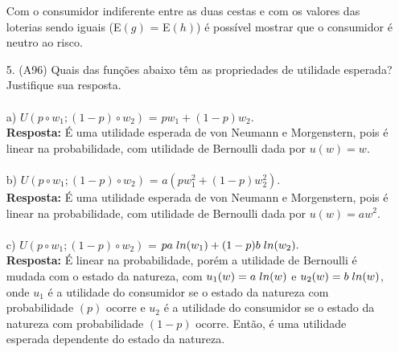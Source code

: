 \begin{enumerate}
Com o consumidor indiferente entre as duas cestas e com os valores das loterias sendo iguais (E{$(g)$} = E{$(h)$}) é possível mostrar que o consumidor é neutro ao risco.\\

\item[5.] (A96) Quais das funções abaixo têm as propriedades de utilidade esperada? Justifique sua resposta.\\

\paragraph{} a) {$U( p \circ w_1; (1 - p) \circ w_2)$} = {$ pw_1 + (1 - p)w_2.$}\\

\textbf{Resposta:} É uma utilidade esperada de von Neumann e Morgenstern, pois é linear na probabilidade, com utilidade de Bernoulli dada por {$u(w) = w$}.\\


\paragraph{} b) {$U( p \circ w_1; (1 - p) \circ w_2)$} = {$  a(pw_1^2 + (1 - p)w_2^2).$}\\

\textbf{Resposta:} É uma utilidade esperada de von Neumann e Morgenstern, pois é linear na probabilidade, com utilidade de Bernoulli dada por {$u(w) = aw^2$}.\\

\paragraph{} c) {$U( p \circ w_1; (1 - p) \circ w_2)$} = {$ p a \hspace{0,1cm} ln(w_1) + (1 - p)b \hspace{0,1cm} ln(w_2).$}\\

\textbf{Resposta:} É linear na probabilidade, porém a utilidade de Bernoulli é mudada com o estado da natureza, com {$u_1(w) = a\hspace{0,1cm}ln(w)$} e {$u_2(w) = b\hspace{0,1cm}ln(w)$}, onde {$u_1$} é a utilidade do consumidor se o estado da natureza com probabilidade {$(p)$} ocorre e {$u_2$} é a utilidade do consumidor se o estado da natureza com probabilidade {$(1 - p)$} ocorre. Então, é uma utilidade esperada dependente do estado da natureza.


\end{enumerate}
